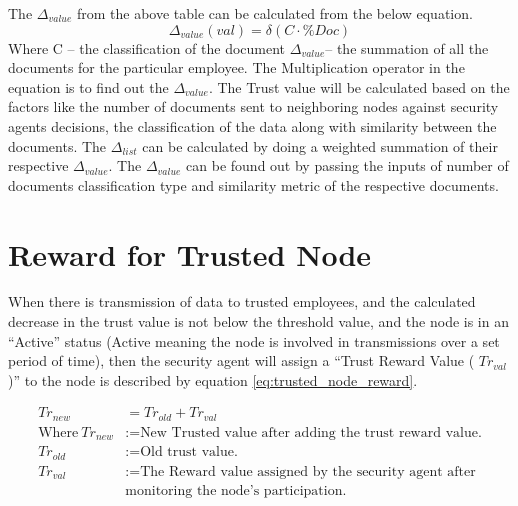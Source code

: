 The \(\Delta_{value}\) from the above table can be calculated from the below equation.
\begin{equation}
    \Delta_{value}(val) = \delta(C \cdot \%Doc)
\end{equation}
Where C – the classification of the document
\( \Delta_{value} \)– the summation of all the documents for the particular employee.
The Multiplication operator in the equation is to find out the \( \Delta_{value} \).
The Trust value will be calculated based on the factors like the number of
documents sent to neighboring nodes against security agents decisions, the
classification of the data along with similarity between the documents. The \(
\Delta_{list} \) can be calculated by doing a weighted summation of their respective \( \Delta_{value} \). The \( \Delta_{value} \) can be found out by passing the inputs of number of documents classification type and  similarity metric of the respective documents.

\section{Reward for Trusted Node}
When there is transmission of data to trusted employees, and the calculated
decrease in the trust value is not below the threshold value, and the node is in
an “Active” status (Active meaning the node is involved in transmissions over
a set period of time), then the security agent will assign a “Trust Reward Value
( \( Tr_{val} \) )” to the node is described by equation \ref{eq:trusted_node_reward}. 

\begin{equation}
    \label{eq:trusted_node_reward}
    \begin{aligned}
    Tr_{new} &= Tr_{old} + Tr_{val} \\
    \text{Where}~Tr_{new} &:= \text{New Trusted value after adding the trust reward value.} \\
    Tr_{old} &:= \text{Old trust value.} \\
    Tr_{val} &:= \text{The Reward value assigned by the security agent after}\\
                 &\text{monitoring the node's participation.}
\end{aligned}
\end{equation}

